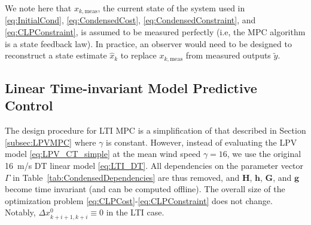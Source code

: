 \documentclass[letterpaper, 10 pt, conference]{ieeeconf}  %
\begin{document}
We note here that $x_{k,\mathrm{meas}}$, the current state of the system used in \eqref{eq:InitialCond}, \eqref{eq:CondensedCost}, \eqref{eq:CondensedConstraint}, and \eqref{eq:CLPConstraint}, is assumed to be measured perfectly (i.e, the MPC algorithm is a state feedback law). In practice, an observer would need to be designed to reconstruct a state estimate $\hat{x}_k$ to replace $x_{k,\mathrm{meas}}$ from measured outputs $\tilde{y}$. %

\subsection{Linear Time-invariant Model Predictive Control}

The design procedure for LTI MPC is a simplification of that described in Section \ref{subsec:LPVMPC} where $\gamma$ is constant. However, instead of evaluating the LPV model \eqref{eq:LPV_CT_simple} at the mean wind speed $\gamma = 16$, we use the original 16~m/s DT linear model \eqref{eq:LTI_DT}. All dependencies on the parameter vector $\Gamma$ in Table~\ref{tab:CondensedDependencies} are thus removed, and $\mathbf{H}$, $\mathbf{h}$, $\mathbf{G}$, and $\mathbf{g}$ become time invariant (and can be computed offline). The overall size of the optimization problem \eqref{eq:CLPCost}-\eqref{eq:CLPConstraint} does not change. Notably, $\Delta x^0_{k+i+1,k+i} \equiv 0$ in the LTI case.
\end{document}
